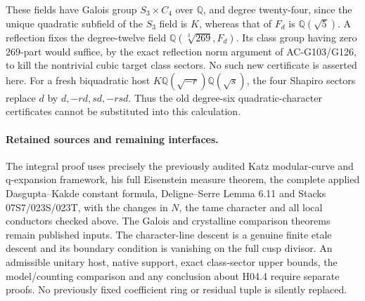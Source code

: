 These fields have Galois group \(S_3\times C_4\) over
\(\mathbb Q\), and degree twenty-four, since the unique
quadratic subfield of the \(S_3\) field is \(K\), whereas
that of \(F_d\) is \(\mathbb Q(\sqrt5)\).
A reflection fixes the degree-twelve field
\(\mathbb Q(\sqrt[3]{269},F_d)\).
Its class group having zero \(269\)-part would suffice,
by the exact reflection norm argument of AC-G103/G126,
to kill the nontrivial cubic target class sectors.
No such new certificate is asserted here.
For a fresh biquadratic host \(K\mathbb Q(\sqrt{-r})
\mathbb Q(\sqrt s)\), the four Shapiro sectors replace
\(d\) by \(d,-rd,sd,-rsd\).
Thus the old degree-six quadratic-character certificates
cannot be substituted into this calculation.

\paragraph{Retained sources and remaining interfaces.}
The integral proof uses precisely the previously audited Katz
modular-curve and q-expansion framework, his full Eisenstein
measure theorem, the complete applied Dasgupta--Kakde constant
formula, Deligne--Serre Lemma 6.11 and Stacks 07S7/023S/023T,
with the changes in \(N\), the tame character and all local
conductors checked above.  The Galois and crystalline comparison
theorems remain published inputs.  The character-line descent
is a genuine finite etale descent and its boundary condition is
vanishing on the full cusp divisor.
An admissible unitary host, native support, exact class-sector
upper bounds, the model/counting comparison and any conclusion
about H04.4 require separate proofs.  No previously fixed
coefficient ring or residual tuple is silently replaced.
